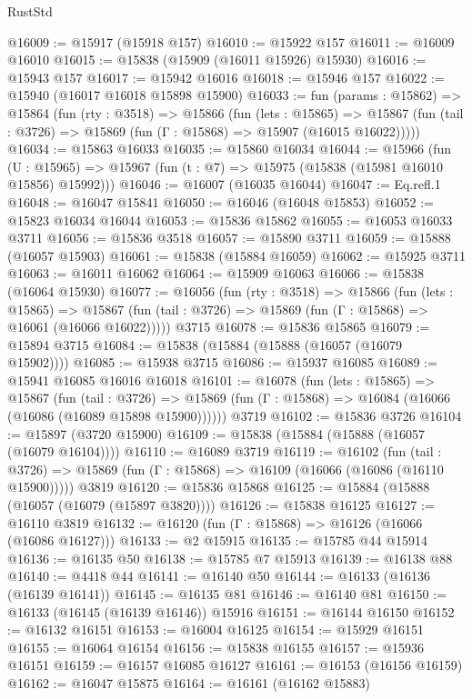 \begin{lexlean}{RustStd}
\begin{coremodule}
@16009 := @15917 (@15918 @157)
@16010 := @15922 @157
@16011 := @16009 @16010
@16015 := @15838 (@15909 (@16011 @15926) @15930)
@16016 := @15943 @157
@16017 := @15942 @16016
@16018 := @15946 @157
@16022 := @15940 (@16017 @16018 @15898 @15900)
@16033 := fun (params : @15862) =>
  @15864
    (fun (rty : @3518) =>
    @15866
      (fun (lets : @15865) =>
      @15867 (fun (tail : @3726) => @15869 (fun (Γ : @15868) => @15907 (@16015 @16022)))))
@16034 := @15863 @16033
@16035 := @15860 @16034
@16044 := @15966
    (fun (U : @15965) => @15967 (fun (t : @7) => @15975 (@15838 (@15981 @16010 @15856) @15992)))
@16046 := @16007 (@16035 @16044)
@16047 := Eq.refl.{1}
@16048 := @16047 @15841
@16050 := @16046 (@16048 @15853)
@16052 := @15823 @16034 @16044
@16053 := @15836 @15862
@16055 := @16053 @16033 @3711
@16056 := @15836 @3518
@16057 := @15890 @3711
@16059 := @15888 (@16057 @15903)
@16061 := @15838 (@15884 @16059)
@16062 := @15925 @3711
@16063 := @16011 @16062
@16064 := @15909 @16063
@16066 := @15838 (@16064 @15930)
@16077 := @16056
    (fun (rty : @3518) =>
    @15866
      (fun (lets : @15865) =>
      @15867 (fun (tail : @3726) => @15869 (fun (Γ : @15868) => @16061 (@16066 @16022)))))
    @3715
@16078 := @15836 @15865
@16079 := @15894 @3715
@16084 := @15838 (@15884 (@15888 (@16057 (@16079 @15902))))
@16085 := @15938 @3715
@16086 := @15937 @16085
@16089 := @15941 @16085 @16016 @16018
@16101 := @16078
    (fun (lets : @15865) =>
    @15867
      (fun (tail : @3726) =>
      @15869 (fun (Γ : @15868) => @16084 (@16066 (@16086 (@16089 @15898 @15900))))))
    @3719
@16102 := @15836 @3726
@16104 := @15897 (@3720 @15900)
@16109 := @15838 (@15884 (@15888 (@16057 (@16079 @16104))))
@16110 := @16089 @3719
@16119 := @16102
    (fun (tail : @3726) => @15869 (fun (Γ : @15868) => @16109 (@16066 (@16086 (@16110 @15900)))))
    @3819
@16120 := @15836 @15868
@16125 := @15884 (@15888 (@16057 (@16079 (@15897 @3820))))
@16126 := @15838 @16125
@16127 := @16110 @3819
@16132 := @16120 (fun (Γ : @15868) => @16126 (@16066 (@16086 @16127)))
@16133 := @2 @15915
@16135 := @15785 @44 @15914
@16136 := @16135 @50
@16138 := @15785 @7 @15913
@16139 := @16138 @88
@16140 := @4418 @44
@16141 := @16140 @50
@16144 := @16133 (@16136 (@16139 @16141))
@16145 := @16135 @81
@16146 := @16140 @81
@16150 := @16133 (@16145 (@16139 @16146)) @15916
@16151 := @16144 @16150
@16152 := @16132 @16151
@16153 := @16004 @16125
@16154 := @15929 @16151
@16155 := @16064 @16154
@16156 := @15838 @16155
@16157 := @15936 @16151
@16159 := @16157 @16085 @16127
@16161 := @16153 (@16156 @16159)
@16162 := @16047 @15875
@16164 := @16161 (@16162 @15883)

\end{coremodule}
\end{lexlean}
